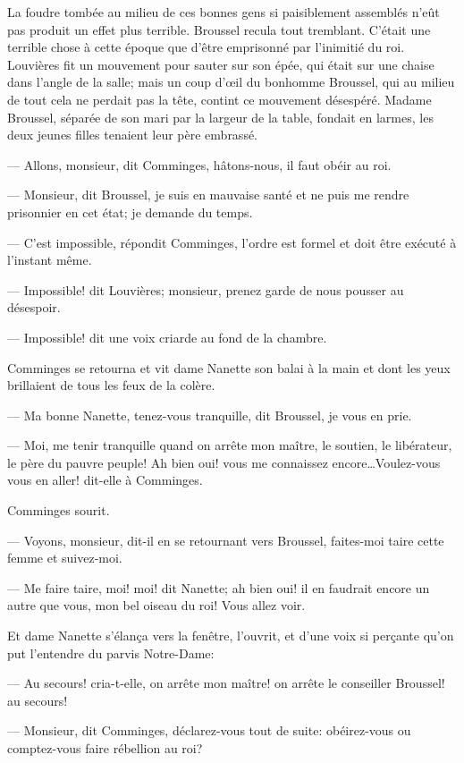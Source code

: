 La foudre tombée au milieu de ces bonnes gens si paisiblement assemblés n'eût pas produit un effet plus terrible. Broussel recula tout tremblant. C'était une terrible chose à cette époque que d'être emprisonné par l'inimitié du roi. Louvières fit un mouvement pour sauter sur son épée, qui était sur une chaise dans l'angle de la salle; mais un coup d'œil du bonhomme Broussel, qui au milieu de tout cela ne perdait pas la tête, contint ce mouvement désespéré. Madame Broussel, séparée de son mari par la largeur de la table, fondait en larmes, les deux jeunes filles tenaient leur père embrassé.

— Allons, monsieur, dit Comminges, hâtons-nous, il faut obéir au roi.

— Monsieur, dit Broussel, je suis en mauvaise santé et ne puis me rendre prisonnier en cet état; je demande du temps.

— C'est impossible, répondit Comminges, l'ordre est formel et doit être exécuté à l'instant même.

— Impossible! dit Louvières; monsieur, prenez garde de nous pousser au désespoir.

— Impossible! dit une voix criarde au fond de la chambre.

Comminges se retourna et vit dame Nanette son balai à la main et dont les yeux brillaient de tous les feux de la colère.

— Ma bonne Nanette, tenez-vous tranquille, dit Broussel, je vous en prie.

— Moi, me tenir tranquille quand on arrête mon maître, le soutien, le libérateur, le père du pauvre peuple! Ah bien oui! vous me connaissez encore\dots Voulez-vous vous en aller! dit-elle à Comminges.

Comminges sourit.

— Voyons, monsieur, dit-il en se retournant vers Broussel, faites-moi taire cette femme et suivez-moi.

— Me faire taire, moi! moi! dit Nanette; ah bien oui! il en faudrait encore un autre que vous, mon bel oiseau du roi! Vous allez voir.

Et dame Nanette s'élança vers la fenêtre, l'ouvrit, et d'une voix si perçante qu'on put l'entendre du parvis Notre-Dame:

— Au secours! cria-t-elle, on arrête mon maître! on arrête le conseiller Broussel! au secours!

— Monsieur, dit Comminges, déclarez-vous tout de suite: obéirez-vous ou comptez-vous faire rébellion au roi?

